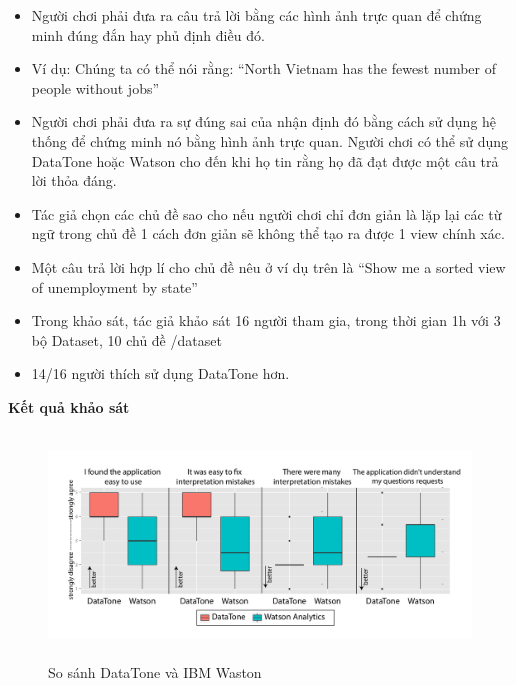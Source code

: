 \documentclass[12pt]{report}
\begin{document}
\begin{itemize}
\begin{itemize}
			\item Người chơi phải đưa ra câu trả lời bằng  các hình ảnh trực quan  để chứng minh đúng đắn hay phủ định điều đó.
			
			\item Ví dụ:  Chúng ta có thể nói rằng: “North Vietnam has the fewest number of people without jobs”
			
			\item Người chơi  phải đưa ra sự đúng sai của nhận định đó bằng cách sử dụng hệ thống để chứng minh nó bằng hình ảnh trực quan. Người chơi có thể sử dụng  DataTone hoặc Watson cho đến khi họ tin rằng họ đã đạt được một câu trả lời thỏa đáng. 
			
			\item Tác  giả chọn các chủ đề sao cho nếu người chơi chỉ đơn giản là lặp lại các từ ngữ trong chủ đề 1 cách đơn giản sẽ không thể tạo ra được 1 view chính xác.
			
			\item Một câu trả lời hợp lí cho chủ đề nêu ở ví dụ trên là  “Show me a sorted view of unemployment by state”
			\item Trong khảo sát, tác giả khảo sát 16 người tham gia, trong thời gian 1h với 3 bộ Dataset, 10 chủ đề /dataset
			\item 14/16 người thích sử dụng DataTone hơn.
		\end{itemize}
\end{itemize}

\textbf{Kết quả khảo sát}
\begin{figure}[h]
	\centering
	\includegraphics[width=20cm,
	height=6cm, keepaspectratio]{Result.png}
	\caption{So sánh DataTone và IBM Waston}
\end{figure}
\end{document}
